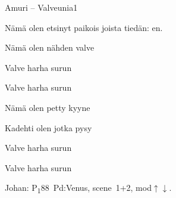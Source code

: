 \documentclass[12pt,a4paper]{article}
\begin{document}
\thispagestyle{empty}
\begin{mysong}{Amuri – Valveunia}{1}

\begin{SBVerse}
  Nämä  olen etsinyt  paikois joista
  tiedän:  en.

  Nämä  olen  nähden 
  valve
\end{SBVerse}

\begin{SBChorus}
  Valve harha surun 

  Valve harha surun 
\end{SBChorus}


\begin{SBVerse}
  Nämä  olen  petty
  kyyne

  Kadehti olen  jotka 
  pysy
\end{SBVerse}

\begin{SBChorus}
  Valve harha surun 

  Valve harha surun 
\end{SBChorus}


{\SBLyricNoteFont Johan: P\textsubscript{1}88~Pd:Venus, scene~1+2,
mod$\uparrow\downarrow$.}

\end{mysong}
\end{document}

